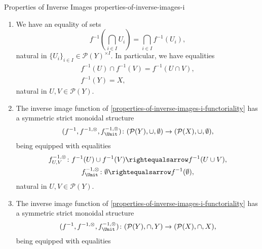 \begin{proposition}{Properties of Inverse Images \rmI}{properties-of-inverse-images-i}
\begin{enumerate}
        \item\label{properties-of-inverse-images-i-preservation-of-limits}We have an equality of sets
            \[
                    f^{-1}\left(\bigcap_{i\in I}U_{i}\right)%
                    =%
                    \bigcap_{i\in I}f^{-1}(U_{i}),%
            \]%
            natural in $\{U_{i}\}_{i\in I}\in\mathcal{P}(Y)^{\times I}$. In particular, we have equalities%
            \[
                \begin{gathered}
                    f^{-1}(U)\cap f^{-1}(V)                  = f^{-1}(U\cap V),\\
                    f^{-1}(Y)                                = X,
                \end{gathered}
            \]%
            natural in $U,V\in\mathcal{P}(Y)$.
        \item\label{properties-of-inverse-images-i-symmetric-strict-monoidality-with-respect-to-unions}The inverse image function of \cref{properties-of-inverse-images-i-functoriality} has a symmetric strict monoidal structure
            \[
                (f^{-1},f^{-1,\otimes},f^{-1,\otimes}_{\Unit})
                \colon
                (\mathcal{P}(Y),\cup,\emptyset)
                \to
                (\mathcal{P}(X),\cup,\emptyset),
            \]%
            being equipped with equalities%
            \[
                \begin{gathered}
                    f^{-1,\otimes}_{U,V}   \colon f^{-1}(U)\cup f^{-1}(V) \rightequalsarrow f^{-1}(U\cup V),\\
                    f^{-1,\otimes}_{\Unit} \colon \emptyset               \rightequalsarrow f^{-1}(\emptyset),
                \end{gathered}
            \]%
            natural in $U,V\in\mathcal{P}(Y)$.
        \item\label{properties-of-inverse-images-i-symmetric-strict-monoidality-with-respect-to-intersections}The inverse image function of \cref{properties-of-inverse-images-i-functoriality} has a symmetric strict monoidal structure
            \[
                (f^{-1},f^{-1,\otimes},f^{-1,\otimes}_{\Unit})
                \colon
                (\mathcal{P}(Y),\cap,Y)
                \to
                (\mathcal{P}(X),\cap,X),
            \]%
            being equipped with equalities%
            \[
                \begin{gathered}

\end{gathered}\]
\end{enumerate}
\end{proposition}

